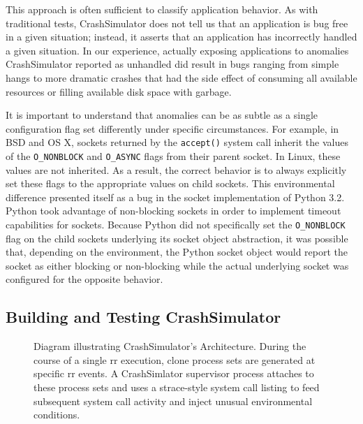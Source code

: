 This approach is often sufficient to classify application behavior.  As
with traditional tests, CrashSimulator does not tell us that an application
is bug free in a given situation; instead, it asserts that an application
has incorrectly handled a given situation.  In our experience, actually
exposing applications to anomalies CrashSimulator reported as unhandled
did result
in bugs ranging from simple hangs to more dramatic crashes that
had the side effect of consuming all available resources or filling
available disk space with garbage.

It is important to understand that anomalies can
be as subtle as a single configuration flag set differently under
specific circumstances.  For example, in BSD and OS X, sockets returned by
the {\tt accept()} system call inherit the values of the {\tt O\_NONBLOCK}
and {\tt O\_ASYNC} flags from their parent socket.  In Linux, these values
are not inherited.  As a result, the correct behavior is to always
explicitly set these flags to the appropriate values on child sockets.
This environmental difference presented itself as a bug in the socket
implementation of Python 3.2.  Python took advantage of non-blocking
sockets in order to implement timeout capabilities for sockets.  Because
Python did not specifically set the {\tt O\_NONBLOCK} flag on the child
sockets underlying its socket object abstraction, it was possible that,
depending on the environment, the Python socket object would report the
socket as either blocking or non-blocking while the actual underlying
socket was configured for the opposite behavior.

\subsection{Building and Testing CrashSimulator}
\label{SEC:architecture}

\begin{figure}[t]
  \center{}
  \caption{Diagram illustrating CrashSimulator's Architecture.  During the
    course of a single rr execution, clone process sets are generated at
    specific rr events.  A CrashSimlator supervisor process attaches to
    these process sets and uses a strace-style system call listing to feed
    subsequent system call activity and inject unusual environmental
    conditions.}
  \label{figure:architecture}
\end{figure}

